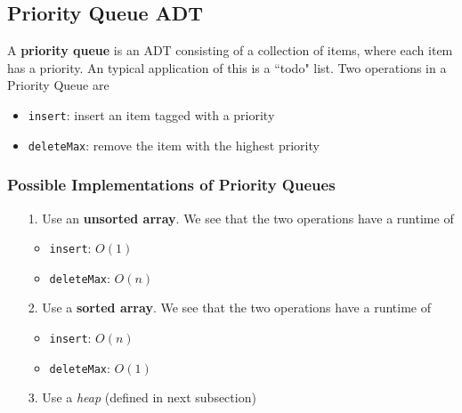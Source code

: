 \documentclass{report}
\begin{document}
\subsection{Priority Queue ADT}
A \textbf{priority queue} is an ADT consisting of a collection of items, where each item has a priority. An typical application of this is a ``todo" list. Two operations in a Priority Queue are
\begin{itemize}
\item \texttt{insert}: insert an item tagged with a priority
\item \texttt{deleteMax}: remove the item with the highest priority
\end{itemize}
\subsubsection{Possible Implementations of Priority Queues}
\begin{itemize}
\item[1.] Use an \textbf{unsorted array}. We see that the two operations have a runtime of
\begin{itemize}
\item \texttt{insert}: $O(1)$
\item \texttt{deleteMax}: $O(n)$
\end{itemize}
\item[2.] Use a \textbf{sorted array}. We see that the two operations have a runtime of
\begin{itemize}
\item \texttt{insert}: $O(n)$
\item \texttt{deleteMax}: $O(1)$
\end{itemize}
\item[3.] Use a \textit{heap} (defined in next subsection)
\end{itemize}
\end{document}
